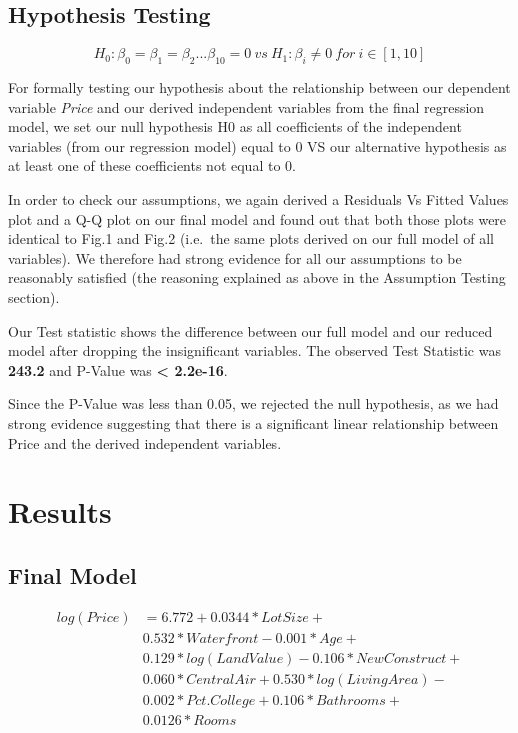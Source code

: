 \documentclass[letterpaper,9pt,twocolumn,twoside,]{pinp}
\begin{document}
\hypertarget{hypothesis-testing}{%
\subsection{Hypothesis Testing}\label{hypothesis-testing}}

\[H_0: \beta_{0} = \beta_{1} = \beta_{2} ... \beta_{10} = 0 \:vs\: H_1: \beta_{i} \neq 0 \:for \:i \in [1,10]\]

For formally testing our hypothesis about the relationship between our
dependent variable \emph{Price} and our derived independent variables
from the final regression model, we set our null hypothesis H0 as all
coefficients of the independent variables (from our regression model)
equal to 0 VS our alternative hypothesis as at least one of these
coefficients not equal to 0.

In order to check our assumptions, we again derived a Residuals Vs
Fitted Values plot and a Q-Q plot on our final model and found out that
both those plots were identical to Fig.1 and Fig.2 (i.e.~the same plots
derived on our full model of all variables). We therefore had strong
evidence for all our assumptions to be reasonably satisfied (the
reasoning explained as above in the Assumption Testing section).

Our Test statistic shows the difference between our full model and our
reduced model after dropping the insignificant variables. The observed
Test Statistic was \textbf{243.2} and P-Value was \textbf{\textless{}
2.2e-16}.

Since the P-Value was less than 0.05, we rejected the null hypothesis,
as we had strong evidence suggesting that there is a significant linear
relationship between Price and the derived independent variables.

\hypertarget{results}{%
\section{Results}\label{results}}

\hypertarget{final-model}{%
\subsection{Final Model}\label{final-model}}

\begin{equation}
  \begin{aligned}
log(Price)&= 6.772 + 0.0344 * Lot Size +\\
       &0.532 * Waterfront - 0.001 * Age + \\
       &0.129 * log(Land Value) - 0.106 * New Construct + \\
       &0.060 * Central Air + 0.530 * log(Living Area) - \\
       &0.002 * Pct.College + 0.106 * Bathrooms + \\
       &0.0126 * Rooms
  \end{aligned}
\end{equation}
\end{document}
